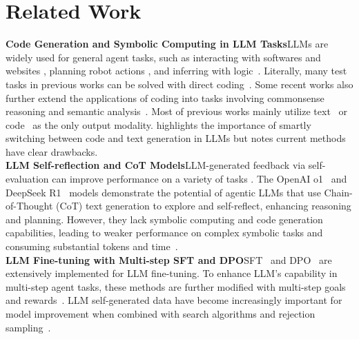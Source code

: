 \section{Related Work}
\label{sec: Related Work}
\textbf{Code Generation and Symbolic Computing in LLM Tasks}\quad LLMs are widely used for general agent tasks, such as interacting with softwares and websites \citep{webarena,travelplanner,llmfp,crab}, planning robot actions \citep{scalable-multi-robot,saycan}, and inferring with logic~\citep{big-bench-hard}. Literally, many test tasks in previous works can be solved with direct coding~\citep{meta-prompting,pal}. Some recent works also further extend the applications of coding into tasks involving commonsense reasoning and semantic analysis~\citep{chain-of-code,weir2024learning}. Most of previous works mainly utilize text~\citep{Tree-of-thought,saycan,text2motion} or code~\citep{code-as-policies,codeplan-code-use-llm,code-based-self-verify} as the only output modality. \citet{codesteering} highlights the importance of smartly switching between code and text generation in LLMs but notes current methods have clear drawbacks.\\
\textbf{LLM Self-reflection and CoT Models}\quad LLM-generated feedback via self-evaluation can improve performance on a variety of tasks \citep{yang2022re3, welleck2022generating, madaan2023self}. The OpenAI o1~\citep{O1-model} and DeepSeek R1~\citep{deepseek} models demonstrate the potential of agentic LLMs that use Chain-of-Thought (CoT) text generation to explore and self-reflect, enhancing reasoning and planning. However, they lack symbolic computing and code generation capabilities, leading to weaker performance on complex symbolic tasks and consuming substantial tokens and time~\citep{overthink-o1}.\\
\textbf{LLM Fine-tuning with Multi-step SFT and DPO}\quad SFT~\citep{SFT-self-play} and DPO~\citep{DPO} are extensively implemented for LLM fine-tuning. To enhance LLM's capability in multi-step agent tasks, these methods are further modified with multi-step goals and rewards~\citep{multi-turn-RLHF,VLM-RL-multi-Turn,CPO}. LLM self-generated data have become increasingly important for model improvement when combined with search algorithms and rejection sampling~\citep{LATS,rstar-math}.